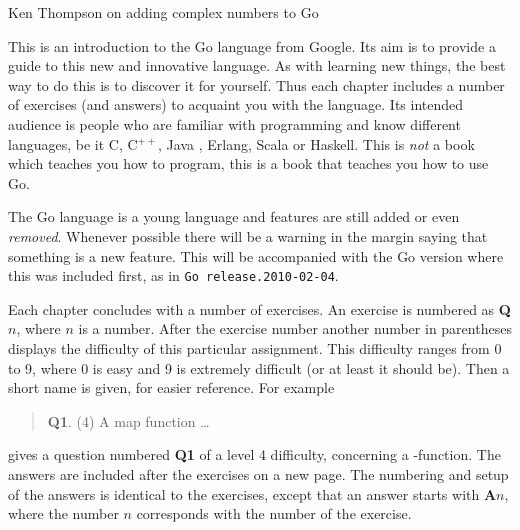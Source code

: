 {Ken Thompson on adding complex numbers to Go}

\noindent{}This is an introduction to the Go language from Google. Its aim
is to provide a guide to this new and innovative language. As with
learning new things, the best way to do this is to discover it for
yourself. Thus each chapter includes a number of exercises (and answers)
to acquaint you with the language.
Its intended audience is people who are familiar with programming
and know different languages, be it C\cite{c}, C$^{++}$\cite{c++}, 
Java \cite{java}, Erlang\cite{erlang}, Scala\cite{scala} or
Haskell\cite{haskell}. This is \emph{not} a book which teaches you how to 
program, this is a book that teaches you how to use Go.

\begin{lbar}
\noindent The Go language is a young language and
features are still added or even \emph{removed}. Whenever
possible there will be a warning in the margin saying that
something is a new feature. This will be accompanied with
the Go version where this was included first, as in
\texttt{\tiny{}Go release.2010-02-04}.
\end{lbar}

Each chapter concludes with a number of exercises. An exercise
is numbered as \textbf{Q$n$}, where $n$ is a number. After the
exercise number another number in parentheses displays the difficulty
of this particular assignment. This difficulty ranges from 0 to 9, where
0 is easy and 9 is extremely difficult (or at least it should be).
Then a short name is given, for easier reference.
For example
\begin{verse}
\textbf{Q1}. (4) A map function \ldots
\end{verse}
    
\noindent gives a question numbered \textbf{Q1} of a level 4 difficulty, concerning a
-function. The answers are included after the exercises on a
new page.
The numbering and setup of the answers is identical to the
exercises, except that an answer starts with \textbf{A$n$}, where the
number $n$ corresponds with the number of the exercise.

